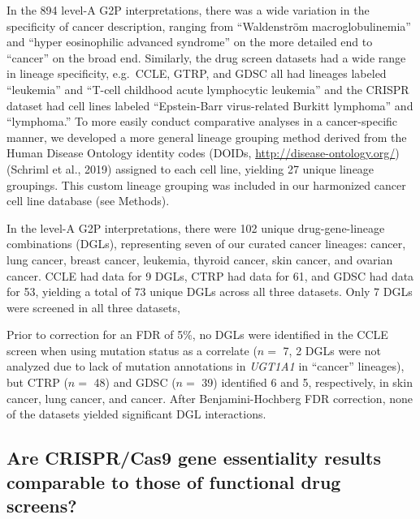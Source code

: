 \documentclass[man,floatsintext]{apa6}
\begin{document}
In the 894 level-A G2P interpretations, there was a wide variation in
the specificity of cancer description, ranging from \enquote{Waldenström
macroglobulinemia} and \enquote{hyper eosinophilic advanced syndrome} on
the more detailed end to \enquote{cancer} on the broad end. Similarly,
the drug screen datasets had a wide range in lineage specificity,
e.g.~CCLE, GTRP, and GDSC all had lineages labeled \enquote{leukemia}
and \enquote{T-cell childhood acute lymphocytic leukemia} and the CRISPR
dataset had cell lines labeled \enquote{Epstein-Barr virus-related
Burkitt lymphoma} and \enquote{lymphoma.} To more easily conduct
comparative analyses in a cancer-specific manner, we developed a more
general lineage grouping method derived from the Human Disease Ontology
identity codes (DOIDs, \url{http://disease-ontology.org/}) (Schriml et
al., 2019) assigned to each cell line, yielding 27 unique lineage
groupings. This custom lineage grouping was included in our harmonized
cancer cell line database (see Methods).

In the level-A G2P interpretations, there were 102 unique
drug-gene-lineage combinations (DGLs), representing seven of our curated
cancer lineages: cancer, lung cancer, breast cancer, leukemia, thyroid
cancer, skin cancer, and ovarian cancer. CCLE had data for 9 DGLs, CTRP
had data for 61, and GDSC had data for 53, yielding a total of 73 unique
DGLs across all three datasets. Only 7 DGLs were screened in all three
datasets,

Prior to correction for an FDR of 5\%, no DGLs were identified in the
CCLE screen when using mutation status as a correlate (\(n =\) 7, 2 DGLs
were not analyzed due to lack of mutation annotations in \emph{UGT1A1}
in \enquote{cancer} lineages), but CTRP (\(n =\) 48) and GDSC (\(n =\)
39) identified 6 and 5, respectively, in skin cancer, lung cancer, and
cancer. After Benjamini-Hochberg FDR correction, none of the datasets
yielded significant DGL interactions.

\subsection{Are CRISPR/Cas9 gene essentiality results comparable to
those of functional drug
screens?}\label{are-crisprcas9-gene-essentiality-results-comparable-to-those-of-functional-drug-screens}
\end{document}
